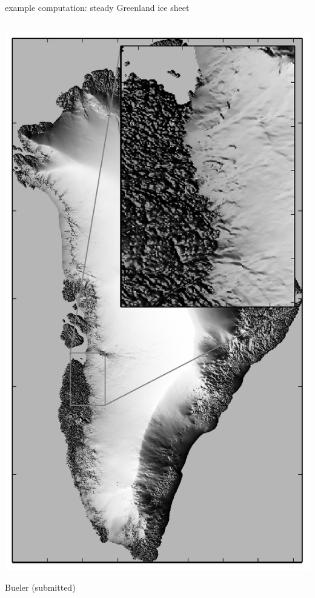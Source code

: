 \documentclass[hide notes,intlimits]{beamer}
\begin{document}
\begin{frame}{example computation: steady Greenland ice sheet}
\begin{columns}
\begin{column}{0.4\textwidth}
\includegraphics[height=0.85\textheight]{grnwinset}

\tiny Bueler (submitted)
\end{column}
\end{columns}
\end{frame}
\end{document}
